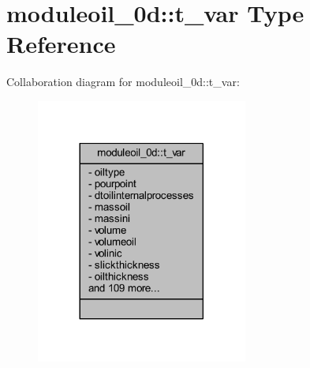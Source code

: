 \hypertarget{structmoduleoil__0d_1_1t__var}{}\section{moduleoil\+\_\+0d\+:\+:t\+\_\+var Type Reference}
\label{structmoduleoil__0d_1_1t__var}


Collaboration diagram for moduleoil\+\_\+0d\+:\+:t\+\_\+var\+:\nopagebreak
\begin{figure}[H]
\begin{center}
\leavevmode
\includegraphics[width=197pt]{structmoduleoil__0d_1_1t__var__coll__graph}
\end{center}
\end{figure}
